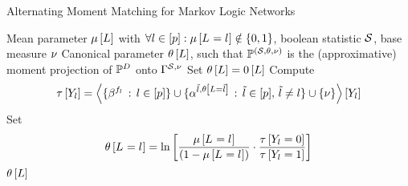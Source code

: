 
\begin{algorithm}[hbt!]
    \caption{Alternating Moment Matching for Markov Logic Networks}\label{alg:AMM_MLN}
    \begin{algorithmic}
        \Require Mean parameter $\mu\left[L\right]$ with $\forall{l\in[p]}:{\mu\left[L_{}=l_{}\right]\notin\{0,1\}}$, boolean statistic $\mathcal{S}$, base measure $\nu$
        \Ensure Canonical parameter $\theta\left[L\right]$, such that $\mathbb{P}^{(\mathcal{S},\theta,\nu)}$ is the (approximative) moment projection of $\mathbb{P}^{D}$ onto $\Gamma^{\mathcal{S},\nu}$
        \iosepline
        \State Set $\theta\left[L\right]=0\left[L\right]$
            \ForAll{$\selindex\in\secnodes$}
                \State Compute
                \begin{align*}
                    \tau\left[Y_{l}\right]
                    = \left\langle \{\beta^{f_{l}} \,:\, l\in[p]\}
                    \cup\{\alpha^{\tilde{l},\theta\left[L=\tilde{l}\right]} \,:\, \tilde{l}\in[p],\,\tilde{l}\neq l\}
                    \cup\{\nu\}\right\rangle \left[ Y_{l} \right]
                \end{align*}
                \State Set
                \begin{align*}
                    \theta\left[L_{}=l_{}\right] = \ln \left[ 
                        \frac{\mu\left[L_{}=l_{}\right]}{(1-\mu\left[L_{}=l_{}\right])}
                        \cdot \frac{\tau\left[Y_{l}=0\right]}{\tau\left[Y_{l}=1\right]}
                     \right]
                \end{align*}
            \EndFor
        \EndWhile
        \State \Return $\theta\left[L\right]$
    \end{algorithmic}
\end{algorithm}

